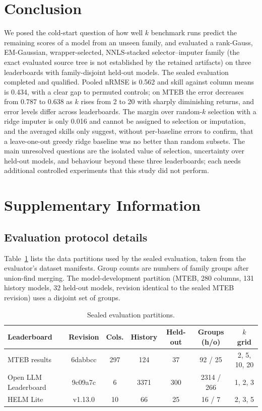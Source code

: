 \documentclass{article}
\begin{document}
\section{Conclusion}
We posed the cold-start question of how well $k$ benchmark runs predict the remaining scores of a model from an unseen family, and evaluated a rank-Gauss, EM-Gaussian, wrapper-selected, NNLS-stacked selector--imputer family (the exact evaluated source tree is not established by the retained artifacts) on three leaderboards with family-disjoint held-out models. The sealed evaluation completed and qualified. Pooled nRMSE is 0.562 and skill against column means is 0.434, with a clear gap to permuted controls; on MTEB the error decreases from 0.787 to 0.638 as $k$ rises from 2 to 20 with sharply diminishing returns, and error levels differ across leaderboards. The margin over random-$k$ selection with a ridge imputer is only 0.016 and cannot be assigned to selection or imputation, and the averaged skills only suggest, without per-baseline errors to confirm, that a leave-one-out greedy ridge baseline was no better than random subsets. The main unresolved questions are the isolated value of selection, uncertainty over held-out models, and behaviour beyond these three leaderboards; each needs additional controlled experiments that this study did not perform.

\clearpage



\clearpage
\appendix
\section{Supplementary Information}

\subsection{Evaluation protocol details}
Table~\ref{tab:data} lists the data partitions used by the sealed evaluation, taken from the evaluator's dataset manifests. %
Group counts are numbers of family groups after union-find merging. The model-development partition (MTEB, 280 columns, 131 history models, 32 held-out models, revision identical to the sealed MTEB revision) uses a disjoint set of groups. %

\begin{table}[h]
\centering
\caption{Sealed evaluation partitions.}
\label{tab:data}
\small
\setlength{\tabcolsep}{4pt}
\begin{tabular}{lcccccc}
\toprule
Leaderboard & Revision & Cols. & History & Held-out & Groups (h/o) & $k$ grid\\
\midrule
MTEB results & 6dabbcc & 297 & 124 & 37 & 92 / 25 & 2, 5, 10, 20\\
Open LLM Leaderboard & 9c09a7c & 6 & 3371 & 300 & 2314 / 266 & 1, 2, 3\\
HELM Lite & v1.13.0 & 10 & 66 & 25 & 16 / 7 & 2, 3, 5\\
\bottomrule
\end{tabular}
\end{table}
\end{document}
